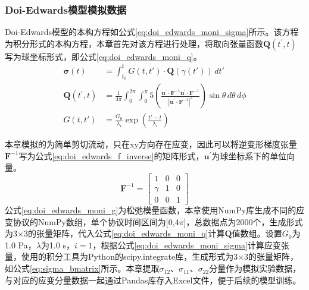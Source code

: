 \subsubsection{Doi-Edwards模型模拟数据}
Doi-Edwards模型的本构方程如公式\eqref{eq:doi_edwards_moni_sigma}所示。该方程为积分形式的本构方程，本章首先对该方程进行处理，将取向张量函数$\mathbf{Q}(t^{\prime},t)$写为球坐标形式，即公式\eqref{eq:doi_edwards_moni_q}。
\begin{align}
  \boldsymbol{\sigma}(t)   & = \int_{t_0}^t G(t, t') \cdot \mathbf{Q}(\gamma(t')) \, dt' \label{eq:doi_edwards_moni_sigma}                                                                                                                                                                               \\
  \mathbf{Q}(t^{\prime},t) & = \frac{1}{4\pi} \int_{0}^{2\pi} \int_{0}^{\pi} 5 \left( \frac{\mathbf{u}^{\prime} \cdot \mathbf{F}^{-1} \mathbf{u}^{\prime} \cdot \mathbf{F}^{-1}}{|\mathbf{u}^{\prime} \cdot \mathbf{F}^{-1}|^{2}} \right) \sin\theta \, d\theta \, d\phi   \label{eq:doi_edwards_moni_q} \\
  G(t, t')                 & = \frac{G_0}{\lambda_i} \exp\left( \frac{t' - t}{\lambda_i} \right)   \label{eq:doi_edwards_moni_g}
\end{align}

本章模拟的为简单剪切流动，只在xy方向存在应变，因此可以将逆变形梯度张量$\mathbf{F}^{-1}$写为公式\eqref{eq:doi_edwards_f_inverse}的矩阵形式，$\mathbf{u}^{\prime}$为球坐标系下的单位向量。
\begin{equation}
  \mathbf{F}^{-1} = \begin{bmatrix}
    1      & 0 & 0 \\
    \gamma & 1 & 0 \\
    0      & 0 & 1
  \end{bmatrix} \label{eq:doi_edwards_f_inverse}
\end{equation}
公式\eqref{eq:doi_edwards_moni_g}为松弛模量函数，本章使用NumPy库生成不同的应变协议的NumPy数组，单个协议时间区间为[0,4$\pi$]，总数据点为2000个，生成形式为3$\times$3的张量矩阵，代入公式\eqref{eq:doi_edwards_moni_q}计算$\mathbf{Q}$值数组。设置$G_0$为1.0 Pa，$\lambda$为1.0 s，$i=1$，根据公式\eqref{eq:doi_edwards_moni_sigma}计算应变张量，使用的积分工具为Python的scipy.integrate库，生成形式为3$\times$3的张量矩阵，如公式\eqref{eq:sigma_bmatrix}所示。本章提取$
  \sigma_{12}$、$\sigma_{11}$、$\sigma_{22}$分量作为模拟实验数据，与对应的应变分量数据一起通过Pandas库存入Excel文件，便于后续的模型训练。


